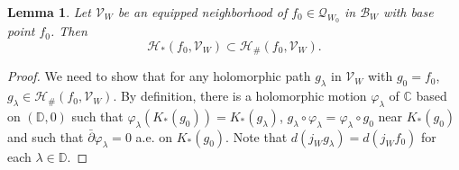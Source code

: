 \documentclass{amsart}
\numberwithin{equation}{section}
\newtheorem{lemma}[theorem]{Lemma}%
\newcommand{\C}{\mathbb C}
\theoremstyle{definition}
\theoremstyle{remark}
\begin{document}
\iffalse
\begin{lemma} \label{lem:promoting} 
Let $\mathcal{V}_W$ be an equipped neighborhood of $f_0\in \mathcal{Q}_{W_0}$ in $\mathcal{B}_W$ with base point $f_0$. Then 
$$\mathcal{H}_*(f_0, \mathcal{V}_W)\subset \mathcal{H}_\# (f_0, \mathcal{V}_W).$$
\end{lemma}
\begin{proof} We need to show that for any holomorphic path $g_\lambda$ in $\mathcal{V}_W$ with $g_0=f_0$, $g_\lambda\in \mathcal{H}_\#(f_0, \mathcal{V}_W)$. By definition, there is a holomorphic motion $\varphi_\lambda$ of $\C$ based on $(\mathbb{D},0)$ such that $\varphi_\lambda(K_*(g_0))=K_*(g_\lambda)$,  
$g_\lambda\circ \varphi_\lambda=\varphi_\lambda\circ g_0$ near $K_*(g_0)$ and such that $\bar{\partial }\varphi_\lambda=0$ a.e. on $K_*(g_0)$. Note that $d(j_W g_\lambda)=d(j_Wf_0)$ for each $\lambda\in \mathbb{D}$. 



\end{proof}
\end{document}
